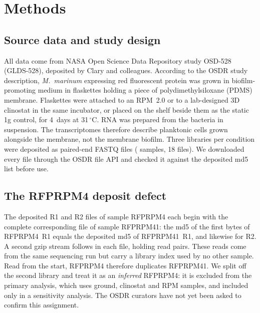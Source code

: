 \section*{Methods}

\subsection*{Source data and study design}
All data come from NASA Open Science Data Repository study OSD-528 (GLDS-528)\cite{osd528data}, deposited by Clary and colleagues\cite{clary2022development}. According to the OSDR study description, \textit{M.~marinum} expressing red fluorescent protein was grown in biofilm-promoting medium in flaskettes holding a piece of polydimethylsiloxane (PDMS) membrane. Flaskettes were attached to an RPM~2.0 or to a lab-designed 3D clinostat in the same incubator, or placed on the shelf beside them as the static 1g control, for 4~days at 31\,$^\circ$C. RNA was prepared from the bacteria in suspension. The transcriptomes therefore describe planktonic cells grown alongside the membrane, not the membrane biofilm. Three libraries per condition were deposited as paired-end FASTQ files (\nSamplesDeposited{} samples, 18 files). We downloaded every file through the OSDR file API and checked it against the deposited md5 list before use.

\subsection*{The RFPRPM4 deposit defect}
The deposited R1 and R2 files of sample RFPRPM4 each begin with the complete corresponding file of sample RFPRPM41: the md5 of the first \rpmFourPrefixBytesRone{} bytes of RFPRPM4~R1 equals the deposited md5 of RFPRPM41~R1, and likewise for R2. A second gzip stream follows in each file, holding \rpmFourPairs{} read pairs. These reads come from the same sequencing run but carry a library index used by no other sample. Read from the start, RFPRPM4 therefore duplicates RFPRPM41. We split off the second library and treat it as an \emph{inferred} RFPRPM4: it is excluded from the primary analysis, which uses \nGround{} ground, \nClino{} clinostat and \nRpm{} RPM samples, and included only in a sensitivity analysis. The OSDR curators have not yet been asked to confirm this assignment.

